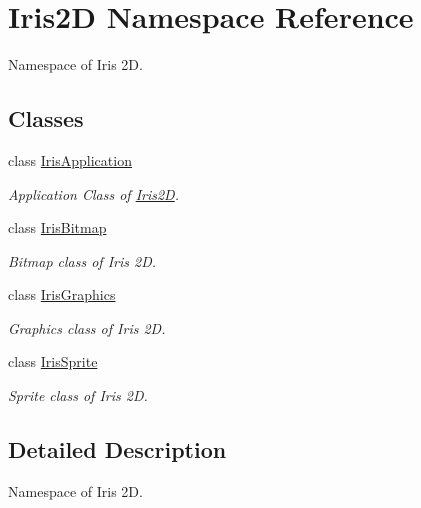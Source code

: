 \hypertarget{namespace_iris2_d}{}\section{Iris2D Namespace Reference}
\label{namespace_iris2_d}


Namespace of Iris 2D.  


\subsection*{Classes}
\begin{DoxyCompactItemize}
\item 
class \hyperlink{class_iris2_d_1_1_iris_application}{Iris\+Application}
\begin{DoxyCompactList}\small\item\em Application Class of \hyperlink{namespace_iris2_d}{Iris2D}. \end{DoxyCompactList}\item 
class \hyperlink{class_iris2_d_1_1_iris_bitmap}{Iris\+Bitmap}
\begin{DoxyCompactList}\small\item\em Bitmap class of Iris 2D. \end{DoxyCompactList}\item 
class \hyperlink{class_iris2_d_1_1_iris_graphics}{Iris\+Graphics}
\begin{DoxyCompactList}\small\item\em Graphics class of Iris 2D. \end{DoxyCompactList}\item 
class \hyperlink{class_iris2_d_1_1_iris_sprite}{Iris\+Sprite}
\begin{DoxyCompactList}\small\item\em Sprite class of Iris 2D. \end{DoxyCompactList}\end{DoxyCompactItemize}


\subsection{Detailed Description}
Namespace of Iris 2D. 